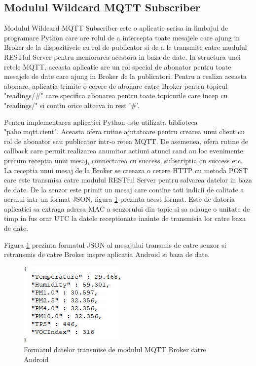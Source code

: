 \subsection{Modulul Wildcard MQTT Subscriber}\label{subsec:pi_mqttbroker_wildcard}
Modulul Wildcard MQTT Subscriber este o aplicatie scrisa in limbajul de programare Python care are rolul de a intercepta toate mesajele care ajung in Broker de la dispozitivele 
cu rol de publicator si de a le transmite catre modulul RESTful Server pentru memorarea acestora in baza de date. In structura unei retele MQTT, aceasta aplicatie are un rol 
special de abonator pentru toate mesajele de date care ajung in Broker de la publicatori. Pentru a realiza aceasta abonare, aplicatia trimite o cerere de abonare catre 
Broker pentru topicul "readings/\#" care specifica abonarea pentru toate topicurile care incep cu "readings/" si contin orice altceva in rest '\#'.

Pentru implementarea aplicatiei Python este utilizata biblioteca "paho.mqtt.cient". Aceasta ofera rutine ajutatoare pentru crearea unui client cu rol de abonator sau publicator 
intr-o retea MQTT. De asemenea, ofera rutine de callback care permit realizarea anumitor actiuni atunci cand au loc evenimente precum receptia unui mesaj, connectarea cu 
success, subscriptia cu success etc. La receptia unui mesaj de la Broker se creeaza o cerere HTTP cu metoda POST care este transmisa catre modulul RESTful Server pentru 
salvarea datelor in baza de date. De la senzor este primit un mesaj care contine toti indicii de calitate a aerului intr-un format JSON, figura 
\ref{fig:Mqtt2AndroidDataFormat} prezinta acest format. Este de datoria aplicatiei sa extraga adresa MAC a senzorului din topic si sa adauge o unitate de timp in 
fus orar UTC la datele receptionate inainte de transmisia lor catre baza de date.

Figura \ref{fig:Mqtt2AndroidDataFormat} prezinta formatul JSON al mesajului transmis de catre senzor si retransmis de catre Broker inspre aplicatia Android si baza de date.  
\begin{figure}[H]
    \centering
    \includegraphics[scale=0.8]{figs/Mqtt2AndroidDataFormat.png}
    \caption{Formatul datelor transmise de modulul MQTT Broker catre Android}
    \label{fig:Mqtt2AndroidDataFormat}
\end{figure}

